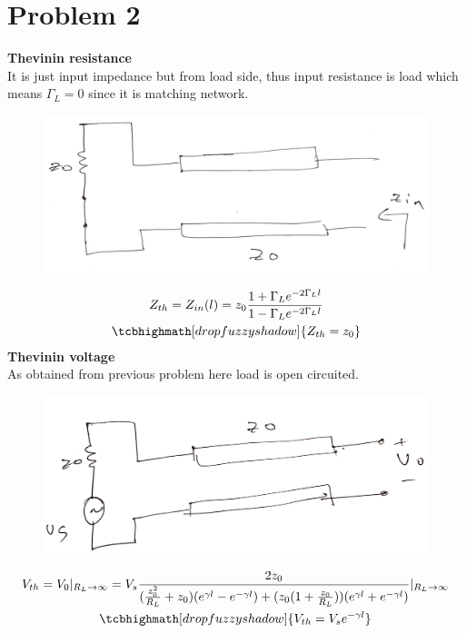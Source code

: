 \documentclass{article}
\begin{document}
\section*{\hfil Problem 2}
\textbf{Thevinin resistance}\\
It is just input impedance but from load side, thus input resistance is load which means $\Gamma _L = 0$ since it is matching network.
\begin{figure}[H]
	\includegraphics[scale=0.3]{rth.png}
\end{figure}
\begin{gather}
Z_{th} = Z_{in}(l) = z_0\frac{1 + \Gamma _Le^{-2\Gamma _Ll}}{1 - \Gamma _Le^{-2\Gamma _Ll}}\\
\tcbhighmath[drop fuzzy shadow]{Z_{th} = z_0}
\end{gather}
\textbf{Thevinin voltage}\\
As obtained from previous problem here load is open circuited.
\begin{figure}[H]
	\includegraphics[scale=0.3]{vth.png}
\end{figure}
\begin{gather}
V_{th} = V_0|_{R_L \to \infty} =  V_s \frac{2z_0}{(\frac{z_0^2}{R_L}+z_0)(e^{\gamma l}-e^{-\gamma l})+(z_0(1+\frac{z_0}{R_L}))(e^{\gamma l}+e^{-\gamma l})}|_{R_L \to \infty}\\
\tcbhighmath[drop fuzzy shadow]{V_{th} = V_se^{-\gamma l}}
\end{gather}
\end{document}
